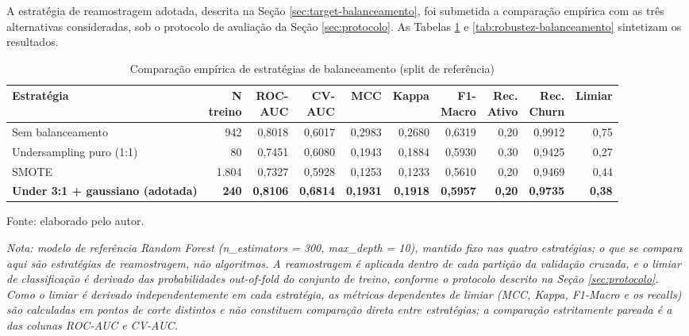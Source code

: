 A estratégia de reamostragem adotada, descrita na Seção \ref{sec:target-balanceamento}, foi submetida a comparação empírica com as três alternativas consideradas, sob o protocolo de avaliação da Seção \ref{sec:protocolo}. As Tabelas \ref{tab:comparacao-balanceamento} e \ref{tab:robustez-balanceamento} sintetizam os resultados.

\begin{table}[htbp]
\ABNTEXfontereduzida
\SingleSpacing
\caption{Comparação empírica de estratégias de balanceamento (split de referência)}
\label{tab:comparacao-balanceamento}
\centering
\scriptsize
\setlength{\tabcolsep}{3pt}
\begin{tabular}{@{}>{\raggedright\arraybackslash}p{3.0cm}rrrrrrrrr@{}}
\hline
\textbf{Estratégia} & \shortstack[r]{\textbf{N}\\\textbf{treino}} & \shortstack[r]{\textbf{ROC-}\\\textbf{AUC}} & \shortstack[r]{\textbf{CV-}\\\textbf{AUC}} & \textbf{MCC} & \textbf{Kappa} & \shortstack[r]{\textbf{F1-}\\\textbf{Macro}} & \shortstack[r]{\textbf{Rec.}\\\textbf{Ativo}} & \shortstack[r]{\textbf{Rec.}\\\textbf{Churn}} & \textbf{Limiar} \\
\hline
Sem balanceamento & 942 & 0,8018 & 0,6017 & 0,2983 & 0,2680 & 0,6319 & 0,20 & 0,9912 & 0,75 \\
Undersampling puro (1:1) & 80 & 0,7451 & 0,6080 & 0,1943 & 0,1884 & 0,5930 & 0,30 & 0,9425 & 0,27 \\
SMOTE & 1.804 & 0,7327 & 0,5928 & 0,1253 & 0,1233 & 0,5610 & 0,20 & 0,9469 & 0,44 \\
\textbf{Under 3:1 + gaussiano (adotada)} & \textbf{240} & \textbf{0,8106} & \textbf{0,6814} & \textbf{0,1931} & \textbf{0,1918} & \textbf{0,5957} & \textbf{0,20} & \textbf{0,9735} & \textbf{0,38} \\
\hline
\end{tabular}
\begin{flushleft}
	\ABNTEXfontereduzida
	\SingleSpacing
	Fonte: elaborado pelo autor.

	\textit{Nota: modelo de referência Random Forest (n\_estimators = 300, max\_depth = 10), mantido fixo nas quatro estratégias; o que se compara aqui são estratégias de reamostragem, não algoritmos. A reamostragem é aplicada dentro de cada partição da validação cruzada, e o limiar de classificação é derivado das probabilidades out-of-fold do conjunto de treino, conforme o protocolo descrito na Seção \ref{sec:protocolo}. Como o limiar é derivado independentemente em cada estratégia, as métricas dependentes de limiar (MCC, Kappa, F1-Macro e os recalls) são calculadas em pontos de corte distintos e não constituem comparação direta entre estratégias; a comparação estritamente pareada é a das colunas ROC-AUC e CV-AUC.}
\end{flushleft}
\end{table}

